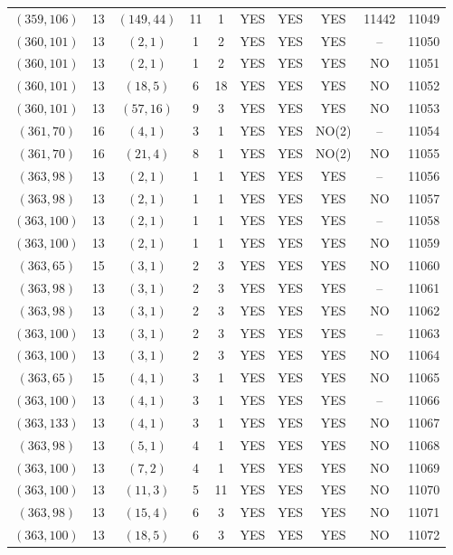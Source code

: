 \begin{longtable}{|c|c|c|c|c|c|c|c|c|c|}
$(359, 106)$ & 13 & $(149, 44)$ & 11 & 1 & YES & YES & YES & 11442 & 11049\\
$(360, 101)$ & 13 & $(2, 1)$ & 1 & 2 & YES & YES & YES & -- & 11050\\
$(360, 101)$ & 13 & $(2, 1)$ & 1 & 2 & YES & YES & YES & NO & 11051\\
$(360, 101)$ & 13 & $(18, 5)$ & 6 & 18 & YES & YES & YES & NO & 11052\\
$(360, 101)$ & 13 & $(57, 16)$ & 9 & 3 & YES & YES & YES & NO & 11053\\
$(361, 70)$ & 16 & $(4, 1)$ & 3 & 1 & YES & YES & NO(2) & -- & 11054\\
$(361, 70)$ & 16 & $(21, 4)$ & 8 & 1 & YES & YES & NO(2) & NO & 11055\\
$(363, 98)$ & 13 & $(2, 1)$ & 1 & 1 & YES & YES & YES & -- & 11056\\
$(363, 98)$ & 13 & $(2, 1)$ & 1 & 1 & YES & YES & YES & NO & 11057\\
$(363, 100)$ & 13 & $(2, 1)$ & 1 & 1 & YES & YES & YES & -- & 11058\\
$(363, 100)$ & 13 & $(2, 1)$ & 1 & 1 & YES & YES & YES & NO & 11059\\
$(363, 65)$ & 15 & $(3, 1)$ & 2 & 3 & YES & YES & YES & NO & 11060\\
$(363, 98)$ & 13 & $(3, 1)$ & 2 & 3 & YES & YES & YES & -- & 11061\\
$(363, 98)$ & 13 & $(3, 1)$ & 2 & 3 & YES & YES & YES & NO & 11062\\
$(363, 100)$ & 13 & $(3, 1)$ & 2 & 3 & YES & YES & YES & -- & 11063\\
$(363, 100)$ & 13 & $(3, 1)$ & 2 & 3 & YES & YES & YES & NO & 11064\\
$(363, 65)$ & 15 & $(4, 1)$ & 3 & 1 & YES & YES & YES & NO & 11065\\
$(363, 100)$ & 13 & $(4, 1)$ & 3 & 1 & YES & YES & YES & -- & 11066\\
$(363, 133)$ & 13 & $(4, 1)$ & 3 & 1 & YES & YES & YES & NO & 11067\\
$(363, 98)$ & 13 & $(5, 1)$ & 4 & 1 & YES & YES & YES & NO & 11068\\
$(363, 100)$ & 13 & $(7, 2)$ & 4 & 1 & YES & YES & YES & NO & 11069\\
$(363, 100)$ & 13 & $(11, 3)$ & 5 & 11 & YES & YES & YES & NO & 11070\\
$(363, 98)$ & 13 & $(15, 4)$ & 6 & 3 & YES & YES & YES & NO & 11071\\
$(363, 100)$ & 13 & $(18, 5)$ & 6 & 3 & YES & YES & YES & NO & 11072\\

\end{longtable}

